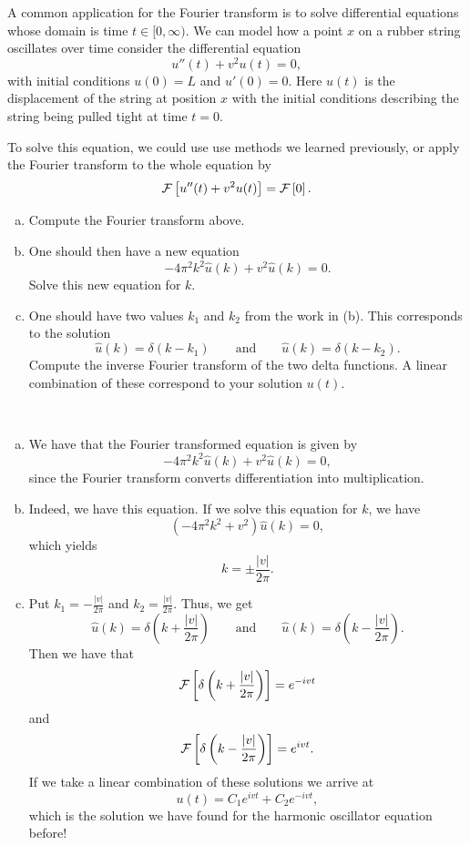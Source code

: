 \documentclass[12pt]{article} %
\begin{document}
\newpage
\begin{problem}
A common application for the Fourier transform is to solve differential equations whose domain is time $t\in [0,\infty)$. We can model how a point $x$ on a rubber string oscillates over time consider the differential equation
\[
u''(t)+v^2u(t)=0,
\]
with initial conditions $u(0)=L$ and $u'(0)=0$. Here $u(t)$ is the displacement of the string at position $x$ with the initial conditions describing the string being pulled tight at time $t=0$.
\begin{figure}[H]
	\centering
	\def\svgwidth{\columnwidth}
	
\end{figure}
To solve this equation, we could use use methods we learned previously, or apply the Fourier transform to the whole equation by
\[
\mathcal{F}\left[ u''(t)+v^2u(t) \right]=\mathcal{F}\left[ 0 \right].
\]
\begin{enumerate}[(a)]
	\item Compute the Fourier transform above.
	\item One should then have a new equation
	\[
	-4\pi^2k^2\hat{u}(k)+v^2\hat{u}(k)=0.
	\]
	Solve this new equation for $k$.
	\item One should have two values $k_1$ and $k_2$ from the work in (b).  This corresponds to the solution
	\[
	\hat{u}(k)=\delta(k-k_1) \qquad \textrm{and} \qquad \hat{u}(k)=\delta(k-k_2).
	\]
	Compute the inverse Fourier transform of the two delta functions. A linear combination of these correspond to your solution $u(t)$.
\end{enumerate}
\end{problem}
\begin{solution}~
	\begin{enumerate}[(a)]
		\item We have that the Fourier transformed equation is given by
		\[
		-4\pi^2k^2 \hat{u}(k)+v^2 \hat{u}(k) = 0,
		\]
		since the Fourier transform converts differentiation into multiplication.  
		\item Indeed, we have this equation.  If we solve this equation for $k$, we have
		\[
		(-4\pi^2k^2+v^2)\hat{u}(k)=0,
		\]
		which yields
		\[
		k = \pm \frac{|v|}{2\pi}.
		\]
		\item Put $k_1 = -\frac{|v|}{2\pi}$ and $k_2=\frac{|v|}{2\pi}$.  Thus, we get
		\[
		\hat{u}(k) = \delta\left(k+\frac{|v|}{2\pi}\right) \qquad \textrm{and} \qquad \hat{u}(k) = \delta\left(k-\frac{|v|}{2\pi}\right).
		\]
		Then we have that
		\[
		\mathcal{F}\left[ \delta\left(k+\frac{|v|}{2\pi}\right) \right] = e^{-ivt}
		\]
		and
		\[
		\mathcal{F}\left[ \delta\left(k-\frac{|v|}{2\pi}\right) \right] = e^{ivt}.
		\]
		If we take a linear combination of these solutions we arrive at
		\[
		u(t) = C_1 e^{ivt}+C_2 e^{-ivt},
		\]
		which is the solution we have found for the harmonic oscillator equation before!
	\end{enumerate}
\end{solution}
\end{document}
